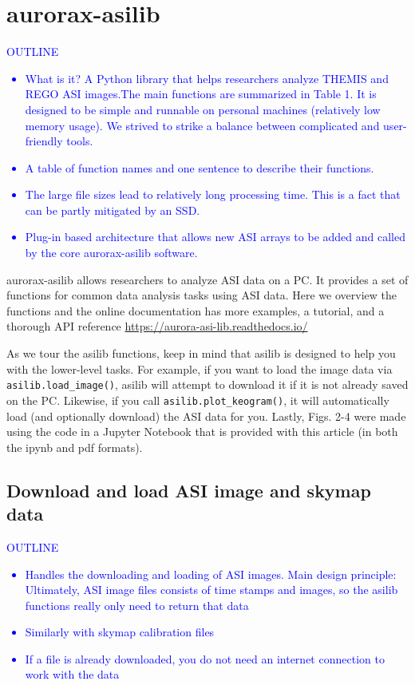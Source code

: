 \documentclass[draft]{agujournal2019}
\begin{document}
\section{aurorax-asilib}\label{aurorax-asilib}
\textcolor{blue}{
      OUTLINE
      \begin{itemize}
            \item What is it? A Python library that helps researchers analyze THEMIS and REGO ASI images.The main functions are summarized in Table 1. It is designed to be simple and runnable on personal machines (relatively low memory usage). We strived to strike a balance between complicated and user-friendly tools.
            \item A table of function names and one sentence to describe their functions.
            \item The large file sizes lead to relatively long processing time. This is a fact that can be partly mitigated by an SSD. 
            \item Plug-in based architecture that allows new ASI arrays to be added and called by the core aurorax-asilib software.
      \end{itemize}
}

aurorax-asilib allows researchers to analyze ASI data on a PC. It provides a set of functions for common data analysis tasks using ASI data. Here we overview the functions and the online documentation has more examples, a tutorial, and a thorough API reference \url{https://aurora-asi-lib.readthedocs.io/}

As we tour the asilib functions, keep in mind that asilib is designed to help you with the lower-level tasks. For example, if you want to load the image data via \verb|asilib.load_image()|, asilib will attempt to download it if it is not already saved on the PC. Likewise, if you call \verb|asilib.plot_keogram()|, it will automatically load (and optionally download) the ASI data for you. Lastly, Figs. 2-4 were made using the code in a Jupyter Notebook that is provided with this article (in both the ipynb and pdf formats).

\subsection{Download and load ASI image and skymap data}
\textcolor{blue}{
      OUTLINE
      \begin{itemize}
            \item Handles the downloading and loading of ASI images. Main design principle: Ultimately, ASI image files consists of time stamps and images, so the asilib functions really only need to return that data
            \item Similarly with skymap calibration files
            \item If a file is already downloaded, you do not need an internet connection to work with the data
      \end{itemize}
}
\end{document}
